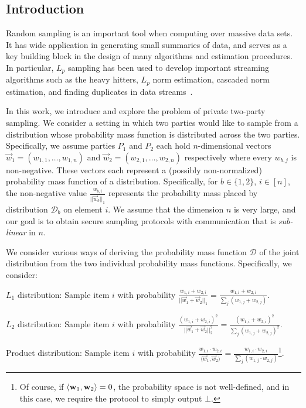 \subsection{Introduction}
Random sampling is an important tool when computing over massive data sets.
It has wide application in generating small summaries of data, and serves
as a key building block in the design of many algorithms and estimation
procedures.  
%
In particular, $L_p$ sampling has been used to develop important streaming
algorithms such as the heavy hitters, $L_p$ norm estimation, cascaded norm
estimation, and finding duplicates in data
streams~\cite{AKO11,MW10,JST11,BOZ12}. 

In this work, we introduce and explore the problem of  private two-party
sampling.  We consider a setting in which two parties would like to
sample from a distribution whose probability mass function is
distributed across the two parties.  Specifically, we assume parties
$P_1$ and $P_2$ each hold $n$-dimensional vectors $\vec{w}_1 = (w_{1,1},
\ldots, w_{1,n})$ and $\vec{w}_2 = (w_{2,1}, \ldots, w_{2,n})$
respectively where every $w_{b,j}$ is non-negative.  
%
These vectors each represent a (possibly non-normalized) probability
mass function of a distribution. Specifically, for $b \in \{1,2\}$, $i
\in [n]$, the non-negative value $\frac{w_{b,i}}{||\vec{w}_b||_1}$
represents the probability mass placed by distribution $\mathcal{D}_b$
on element $i$.
%
We assume that the dimension $n$ is very large, and our goal is to
obtain secure sampling protocols with communication that is
\emph{sub-linear} in $n$.


We consider various ways of deriving the probability mass function
$\mathcal{D}$ of the joint distribution from the
two individual probability mass
functions.  Specifically, we consider:

\BI
\item $L_1$ distribution: Sample item $i$ with probability $\frac
{w_{1,i} + w_{2,i}} {||\vec{w}_1 + \vec{w}_2||_1} = \frac{w_{1,i} +
w_{2,i}} {\sum_j (w_{1,j} + w_{2,j})}$. 

\item $L_2$ distribution: Sample item $i$ with probability $\frac
{(w_{1,i} + w_{2,i})^2} {||\vec{w}_1+\vec{w}_2||_2^2}
= \frac{(w_{1,i} + w_{2,i})^2} {\sum_j (w_{1,j} + w_{2,j})^2}$. 


\item Product distribution: Sample item $i$ with probability
$\frac{w_{1,i} \cdot w_{2,i}}{\langle \vec{w}_1, \vec{w}_2 \rangle}  =
\frac{w_{1,i} \cdot w_{2,i}} {\sum_j (w_{1,j} \cdot w_{2,j})}$\footnote{Of course, if $\langle \mathbf{w}_1, \mathbf{w}_2 \rangle = 0$, the probability space is not well-defined, and
in this case, we require the protocol to simply output $\bot$.}.
\EI



